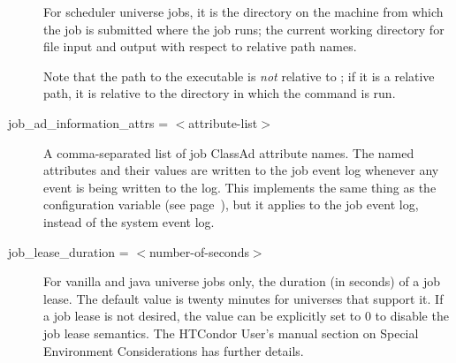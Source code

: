 \begin{description}
For scheduler universe jobs,
it is the directory on the machine from which the job is submitted
where the job runs;
the current working directory for file input and output with
respect to relative path names.

Note that the path to the executable is \emph{not} relative to
; if it is a relative path, it is relative to the
directory in which the  command is run.


\label{man-condor-submit-job-ad-information-attrs}
\item[job\_ad\_information\_attrs =  $<$attribute-list$>$]
A comma-separated list of job ClassAd attribute names.
The named attributes and their values are written to the job event log
whenever any event is being written to the log.
This implements the same thing as the configuration variable
 (see
page~\pageref{param:EventLogJobAdInformationAttrs}),
but it applies to the job event log, instead of the system event log.


\label{condor-submit-job-lease-duration}
\item[job\_lease\_duration = $<$number-of-seconds$>$] For vanilla
and java universe jobs only, the duration (in seconds) of a
job lease.
The default value is twenty minutes for universes that support it.
If a job lease is not desired, the value can be explicitly set to 0 to
disable the job lease semantics.
The HTCondor User's manual section on Special Environment Considerations
has further details.



\end{description}
